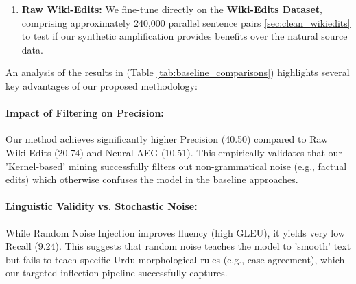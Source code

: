 \documentclass[11pt]{article}
\begin{document}
\begin{enumerate}
    \item \textbf{Raw Wiki-Edits:} We fine-tune directly on the \textbf{Wiki-Edits Dataset}, comprising approximately 240,000 parallel sentence pairs \ref{sec:clean_wikiedits} to test if our synthetic amplification provides benefits over the natural source data.

       \begin{table}[h]
\centering
\small
{}
\caption{Our approach compared with baselines.}
\label{tab:baseline_comparisons}
\end{table}

\end{enumerate}

An analysis of the results in (Table \ref{tab:baseline_comparisons})  highlights several key advantages of our proposed methodology:

\paragraph{Impact of Filtering on Precision:} Our method achieves significantly higher Precision (40.50) compared to Raw Wiki-Edits (20.74) and Neural AEG (10.51). This empirically validates that our 'Kernel-based' mining successfully filters out non-grammatical noise (e.g., factual edits) which otherwise confuses the model in the baseline approaches.

\paragraph{Linguistic Validity vs. Stochastic Noise:} While Random Noise Injection improves fluency (high GLEU), it yields very low Recall (9.24). This suggests that random noise teaches the model to 'smooth' text but fails to teach specific Urdu morphological rules (e.g., case agreement), which our targeted inflection pipeline successfully captures.
\end{document}
